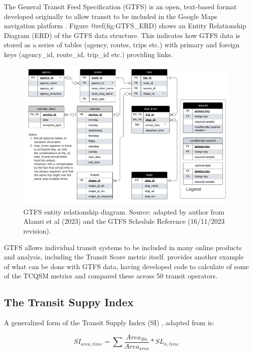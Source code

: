\documentclass[preprint, 3p,
authoryear]{elsarticle} %
\begin{document}
The General Transit Feed Specification (GTFS) is an open, text-based
format developed originally to allow transit to be included in the
Google Maps navigation platform \citep{GTFS}. Figure @ref(fig:GTFS\_ERD)
shows an Entity Relationship Diagram (ERD) of the GTFS data structure.
This indicates how GTFS data is stored as a series of tables (agency,
routes, trips etc.) with primary and foreign keys (agency\_id,
route\_id, trip\_id etc.) providing links.

\begin{figure}
\includegraphics[width=1\linewidth]{graphics/GTFS} \caption{GTFS entity relationship diagram. Source: adapted by author from Alamri et al (2023) and the GTFS Schedule Reference (16/11/2023 revision).}\label{fig:GTFS_ERD}
\end{figure}

GTFS allows individual transit systems to be included in many online
products and analysis, including the Transit Score metric itself.
\citet{Wong:2013aa} provides another example of what can be done with
GTFS data, having developed code to calculate of some of the TCQSM
metrics and compared these across 50 transit operators.

\hypertarget{the-transit-suppy-index}{%
\subsection{The Transit Suppy Index}\label{the-transit-suppy-index}}

A generalized form of the Transit Supply Index (SI) , adapted from
\citet{currie2010identifying} is:

\[SI_{area, time} = \sum{\frac{Area_{Bn}}{Area_{area}}*SL_{n, time}}\]
\end{document}
